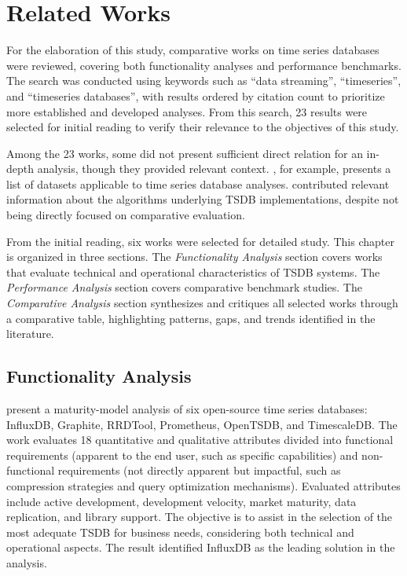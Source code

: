\section{Related Works}
\label{sec:related}

For the elaboration of this study, comparative works on time series databases were reviewed,
covering both functionality analyses and performance benchmarks. The search was conducted
using keywords such as ``data streaming'', ``timeseries'', and ``timeseries databases'',
with results ordered by citation count to prioritize more established and developed analyses.
From this search, 23 results were selected for initial reading to verify their relevance to
the objectives of this study.

Among the 23 works, some did not present sufficient direct relation for an in-depth analysis,
though they provided relevant context. \cite{zubaroglu2021data}, for example, presents a list
of datasets applicable to time series database analyses. \cite{Gaber2005Mining} contributed
relevant information about the algorithms underlying TSDB implementations, despite not being
directly focused on comparative evaluation.

From the initial reading, six works were selected for detailed study. This chapter is organized
in three sections. The \textit{Functionality Analysis} section covers works that evaluate
technical and operational characteristics of TSDB systems. The \textit{Performance Analysis}
section covers comparative benchmark studies. The \textit{Comparative Analysis} section
synthesizes and critiques all selected works through a comparative table, highlighting patterns,
gaps, and trends identified in the literature.

\subsection{Functionality Analysis}

\cite{Petre2019} present a maturity-model analysis of six open-source time series databases:
InfluxDB, Graphite, RRDTool, Prometheus, OpenTSDB, and TimescaleDB. The work evaluates 18
quantitative and qualitative attributes divided into functional requirements (apparent to the
end user, such as specific capabilities) and non-functional requirements (not directly
apparent but impactful, such as compression strategies and query optimization mechanisms).
Evaluated attributes include active development, development velocity, market maturity, data
replication, and library support. The objective is to assist in the selection of the most
adequate TSDB for business needs, considering both technical and operational aspects. The
result identified InfluxDB as the leading solution in the analysis.

